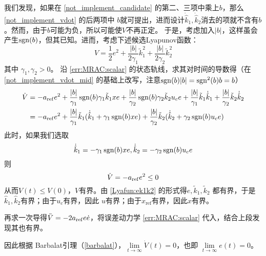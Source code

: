 我们发现，如果在 \eqref{not_implement_candidate} 的第二、三项中乘上$b$，那么 \eqref{not_implement_vdot} 的后两项中
$b$就可提出，进而设计$\dot{\hat{k}}_1,\dot{\hat{k}}_2$消去的项就不含有$b$。然而，由于$b$可能为负，所以可能使$V$不再正定。
于是，考虑加入$|b|$，这样虽会产生$\operatorname{sgn}(b)$，但其已知。进而，考虑下述候选Lyapunov函数：
\begin{equation}
  V = \frac{1}{2} e^2 + \frac{| b |}{2 \gamma_1} \tilde{k}^2_1 + \frac{| b |}{2 \gamma_2} \tilde{k}^2_2 \label{Lyafun:ek1k2}
\end{equation}
其中 $\gamma_1, \gamma_2 > 0$。
沿 \eqref{err:MRAC:scalar} 的状态轨线，求其对时间的导数得（在 \eqref{not_implement_vdot_mid} 的基础上改写，注意$\operatorname{sgn}(b)|b|=\operatorname{sgn}^2(b)b=b$）
\begin{align*}
  \dot{V} & = - a_{\operatorname{ref}} e^2 + \frac{ | b |}{\gamma_1} \operatorname{sgn}(b) \gamma_1 \tilde{k} _1 x  e
  + \frac{| b |}{\gamma_2} \operatorname{sgn}(b){\gamma_2}\tilde{k} _2 u_c e
  + \frac{| b |}{\gamma_1}\tilde{k} _1 \dot{\hat{k}}_1 + \frac{| b |}{\gamma_2}\tilde{k} _2\dot{\hat{k}}_2 \\
          & = - a_{\operatorname{ref}} e^2
  + \frac{| b |}{\gamma_1} \tilde{k} _1 (\dot{\hat{k}}_1 + \gamma_1\operatorname{sgn} (b) x  e)
  + \frac{| b |}{\gamma_2} \tilde{k} _2 (\dot{\hat{k}}_2 + \gamma_2 \operatorname{sgn} (b) u_c e)
\end{align*}
此时，如果我们选取
\begin{equation*}
  \dot{\hat{k}}_1 = -  \gamma_1 \operatorname{sgn} (b) x  e,
  \dot{\hat{k}}_2 = -  \gamma_2 \operatorname{sgn} (b) u_c e
\end{equation*}
则
\begin{equation*}
  \dot{V} = - a_{\operatorname{ref}} e^2 \leq 0
\end{equation*}
从而$V (t) \leq V (0)$，$V$有界。由 \eqref{Lyafun:ek1k2} 的形式得$e, \tilde{k} _1, \tilde{k} _2$ 都有界，于是$\hat{k}_1,\hat{k}_2$有界；由于$u_c$有界，因此 $u$有界；由于$x_\mathrm{ref}$有界，因此$x$有界。

再求一次导得$\ddot{V} = - 2a_{\operatorname{ref}} e  \dot{e}$，将误差动力学 \eqref{err:MRAC:scalar} 代入，结合上段发现其也有界。

因此根据 Barbalat引理（\ref{barbalat}），$\lim\limits_{t \rightarrow \infty}
  \dot{V} (t) = 0$，也即 $\lim\limits_{t \rightarrow \infty} e (t) = 0$。

